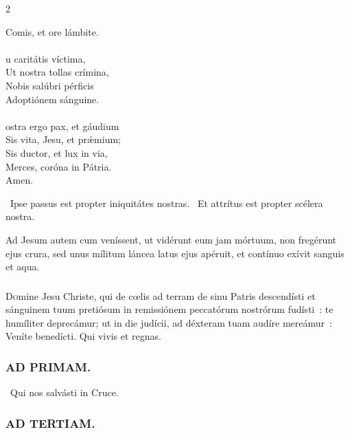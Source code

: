 \documentclass[9pt,twoside]{extarticle}
\begin{document}
\begin{multicols}{2}
{Comis, et ore lámbite.\\
\\
u caritátis víctima,\\
Ut nostra tollas crímina,\\
Nobis salúbri pérficis\\
Adoptiónem sánguine.\\
\\
ostra ergo pax, et gáudium\\
Sis vita, Jesu, et prǽmium;\\
Sis ductor, et lux in via,\\
Merces, coróna in Pátria.\\
Amen.

\begin{tightlist}{}
\item {}~Ipse passus est propter iniquitátes nostras. ~Et attrítus est propter scélera nostra.
\item {} Ad Jesum autem cum veníssent, ut vidérunt eum jam mórtuum, non fregérunt ejus crura, sed unus mílitum láncea latus ejus apéruit, et contínuo exívit sanguis et aqua.
\end{tightlist}

\subsubsection*{\center{}}
\lettrine{D}omine Jesu Christe, qui de cœlis ad terram de sinu Patris descendísti et sánguinem tuum pretiósum in remissiónem peccatórum nostrórum fudísti~: te humíliter deprecámur; ut in die judícii, ad déxteram tuam audíre mereámur~: Veníte benedícti. Qui vivis et regnas.

\begin{tightlist}{}
\item {}
\end{tightlist}

\subsubsection*{\center \textsc{AD PRIMAM.}}
\begin{tightlist}{}
\item {}~Qui nos salvásti in Cruce.
\end{tightlist}

\subsubsection*{\center \textsc{AD TERTIAM.}}
}
\end{multicols}
\end{document}
